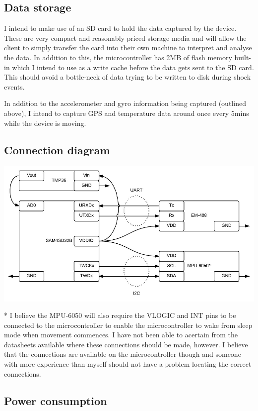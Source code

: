 \documentclass[a4paper, twoside]{article}
\begin{document}
\subsection{Data storage}
I intend to make use of an SD card to hold the data captured by the device.
These are very compact and reasonably priced storage media and will allow the
client to simply transfer the card into their own machine to interpret and
analyse the data. In addition to this, the microcontroller has 2MB of flash
memory built-in which I intend to use as a write cache before the data gets sent
to the SD card. This should avoid a bottle-neck of data trying to be written to
disk during shock events.

In addition to the accelerometer and gyro information being captured (outlined
above), I intend to capture GPS and temperature data around once every 5mins while the device is
moving.

\clearpage
\subsection{Connection diagram}
\begin{center}
\includegraphics[scale=0.45]{images/connectiondiagram.jpeg}
\end{center}
* I believe the MPU-6050 will also require the VLOGIC and INT pins to be
connected to the microcontroller to enable the microcontroller to wake from
sleep mode when movement commences. I have not been able to acertain from the
datasheets available where these connections should be made, however. I believe
that the connections are available on the microcontroller though and someone
with more experience than myself should not have a problem locating the correct
connections.

\subsection{Power consumption}
\end{document}
